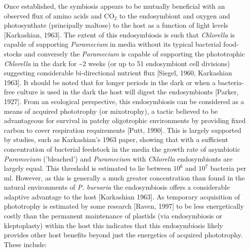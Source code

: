 Once established, the symbiosis appears to be mutually beneficial with an observed flux of amino acids and CO$_{2}$ to the endosymbiont and oxygen and photosynthate (principally maltose) to the host as a function of light levels [Karkashian, 1963]. 
The extent of this endosymbiosis is such that \textit{Chlorella} is capable of supporting \textit{Paramecium} in media without its typical bacterial food-stocks and conversely the \textit{Paramecium} is capable of supporting the phototrophic \textit{Chlorella} in the dark for \textasciitilde 2 weeks (or up to 51 endosymbiont cell divisions) suggesting considerable bi-directional nutrient flux [Siegel, 1960, Karkashian 1963]. 
It should be noted that for longer periods in the dark or when a bacteria-free culture is used in the dark the host will digest the endosymbionts [Parker, 1927].   
From an ecological perspective, this endosymbiosis can be considered as a means of acquired phototrophy (or mixotrophy), a tactic believed to be advantageous for survival in patchy oligotrophic environments by providing fixed carbon to cover respiration requirements [Putt, 1990].  
This is largely supported by studies, such as Karkashian's 1963 paper, showing that with a sufficient concentration of bacterial feedstock in the media the growth rate of asymbiotic \textit{Paramecium} ('bleached') and \textit{Paramecium} with \textit{Chlorella} endosymbionts are largely equal.
This threshold is estimated to lie between $10^{6}$ and $10^{7}$ bacteria per ml.  
However, as this is generally a much greater concentration than found in the natural environments of \textit{P. bursaria} the endosymbiosis offers a considerable adaptive advantage to the host [Karkashian 1963].  
As temporary acquisition of phototrophy is estimated by some research [Raven, 1997] to be less energetically costly than the permanent maintenance of plastids (via endosymbiosis or kleptoplasty) within the host this indicates that this endosymbiosis likely provides other host benefits beyond just the energetics of acquired phototrophy. These include: 
